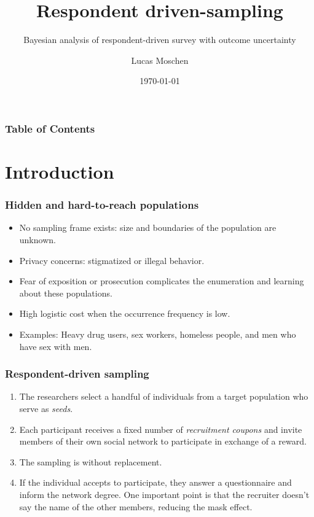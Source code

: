 \documentclass{beamer}
\title[Respondent driven-sampling]
{Respondent driven-sampling}
\subtitle{Bayesian analysis of respondent-driven survey with outcome uncertainty}
\author[Lucas Moschen]
{Lucas Moschen}
\institute[EMAp/FGV]
{
  School of Applied Mathematics\\
  Fundação Getulio Vargas
}
\date[\today]
{\today}
\begin{document}
\frame{\titlepage}

\begin{frame}
\frametitle{Table of Contents}
\tableofcontents
\end{frame}

\section{Introduction}


\begin{frame}
\frametitle{Hidden and hard-to-reach populations}

\begin{itemize}
    \justifying
    \item No sampling frame exists: size and boundaries of the population are unknown.
    \item Privacy concerns: stigmatized or illegal behavior. 
    \item Fear of exposition or prosecution complicates the enumeration and learning about these populations.
    \item High logistic cost when the occurrence frequency is low.
    \item Examples: Heavy drug users, sex workers, homeless people, and men who have sex
    with men. 
\end{itemize}

\end{frame}

\begin{frame}
\frametitle{Respondent-driven sampling}

  \begin{enumerate}
    \justifying
    \item The researchers select a handful of individuals from a target
    population who serve as {\em seeds}.
    \item Each participant receives a fixed number of {\em recruitment coupons} and invite
    members of their own social network to participate in exchange of a
    reward.   
    \item The sampling is without replacement. 
    \item If the individual accepts to participate, they answer a
    questionnaire and inform the network degree. One important point is that
    the recruiter doesn't say the name of the other members, reducing the
    mask effect. 

  \end{enumerate}

\end{frame}
\end{document}
